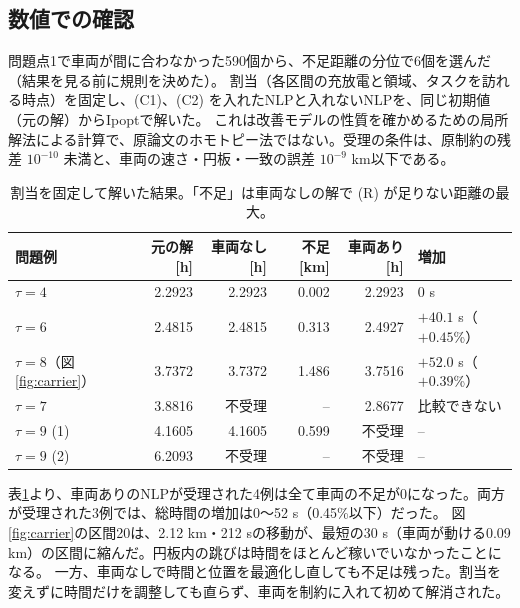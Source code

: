 \documentclass[uplatex,dvipdfmx,a4paper,11pt,jafont=haranoaji]{bxjsarticle}
\newcommand{\answerpart}[1]{\par\Needspace{6\baselineskip}\subsection*{#1}}
\begin{document}
\answerpart{数値での確認}
問題点1で車両が間に合わなかった590個から、不足距離の分位で6個を選んだ（結果を見る前に規則を決めた）。
割当（各区間の充放電と領域、タスクを訪れる時点）を固定し、(C1)、(C2) を入れたNLPと入れないNLPを、同じ初期値（元の解）からIpopt\cite{ipopt}で解いた。
これは改善モデルの性質を確かめるための局所解法による計算で、原論文のホモトピー法ではない。受理の条件は、原制約の残差 $10^{-10}$ 未満と、車両の速さ・円板・一致の誤差 $10^{-9}$ km以下である。
\begin{table}[H]
  \centering
  \caption{割当を固定して解いた結果。「不足」は車両なしの解で (R) が足りない距離の最大。}
  \label{tab:nlp}
  \begin{tabular}{lrrrrl}
    \toprule
    問題例 & 元の解 [h] & 車両なし [h] & 不足 [km] & 車両あり [h] & 増加 \\
    \midrule
    $\tau=4$ & 2.2923 & 2.2923 & 0.002 & 2.2923 & 0 s \\
    $\tau=6$ & 2.4815 & 2.4815 & 0.313 & 2.4927 & $+40.1$ s（$+0.45$\%） \\
    $\tau=8$（図\ref{fig:carrier}） & 3.7372 & 3.7372 & 1.486 & 3.7516 & $+52.0$ s（$+0.39$\%） \\
    $\tau=7$ & 3.8816 & 不受理 & -- & 2.8677 & 比較できない \\
    $\tau=9$ (1) & 4.1605 & 4.1605 & 0.599 & 不受理 & -- \\
    $\tau=9$ (2) & 6.2093 & 不受理 & -- & 不受理 & -- \\
    \bottomrule
  \end{tabular}
\end{table}
表\ref{tab:nlp}より、車両ありのNLPが受理された4例は全て車両の不足が0になった。両方が受理された3例では、総時間の増加は0〜52 s（0.45\%以下）だった。
図\ref{fig:carrier}の区間20は、2.12 km・212 sの移動が、最短の30 s（車両が動ける0.09 km）の区間に縮んだ。円板内の跳びは時間をほとんど稼いでいなかったことになる。
一方、車両なしで時間と位置を最適化し直しても不足は残った。割当を変えずに時間だけを調整しても直らず、車両を制約に入れて初めて解消された。
\end{document}
